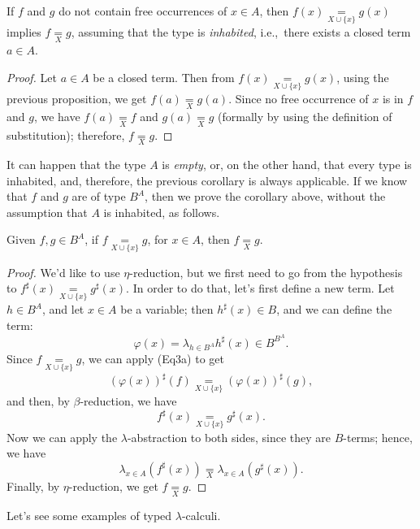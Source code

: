 \begin{corollary}
    If $f$ and $g$ do not contain free occurrences of $x \in A$, then $f(x) \underset{X \cup \{x\}}{=} g(x)$ implies $f \underset{X}{=} g$,
    assuming that the type is \emph{inhabited}, i.e.,\ there exists a closed term $a \in A$.
\end{corollary}

\begin{proof}
   Let $a \in A$ be a closed term. Then from $f(x) \underset{X \cup \{x\}}{=} g(x)$, using the previous proposition, we get $f(a) \underset{X}{=} g(a)$.
   Since no free occurrence of $x$ is in $f$ and $g$, we have $f(a) \underset{X}{=} f$ and $g(a) \underset{X}{=} g$ (formally by using the definition of substitution); therefore, $f \underset{X}{=} g$.
\end{proof}

It can happen that the type $A$ is \emph{empty}, or, on the other hand, that every type is inhabited, and, therefore, the previous corollary is always applicable.\newline
If we know that $f$ and $g$ are of type $B^A$, then we prove the corollary above, without the assumption that $A$ is inhabited, as follows.

\begin{proposition}
    Given $f,g \in B^A$, if $f \underset{X \cup \{x\}}{=} g$, for $x \in A$, then $f \underset{X}{=} g$.
\end{proposition}

\begin{proof}
    We'd like to use $\eta$-reduction, but we first need to go from the hypothesis to $f^\sharp(x) \underset{X \cup \{x\}}{=} g^\sharp(x)$.
    In order to do that, let's first define a new term. Let $h \in B^A$, and let $x \in A$ be a variable; then $h^\sharp(x) \in B$, and we can define the term:
    \[ \varphi(x) = \lambda_{h \in B^A} h^\sharp(x) \in B^{B^A}. \]
    Since $f \underset{X \cup \{x\}}{=} g$, we can apply (Eq3a) to get
    \[ (\varphi(x))^\sharp(f) \underset{X \cup \{x\}}{=} (\varphi(x))^\sharp(g), \]
    and then, by $\beta$-reduction, we have
    \[ f^\sharp(x) \underset{X \cup \{x\}}{=} g^\sharp(x). \]
    Now we can apply the $\lambda$-abstraction to both sides, since they are $B$-terms; hence, we have
    \[ \lambda_{x \in A} (f^\sharp(x)) \underset{X}{=} \lambda_{x \in A} (g^\sharp(x)). \]
    Finally, by $\eta$-reduction, we get $f \underset{X}{=} g$.
\end{proof}

Let's see some examples of typed $\lambda$-calculi.

